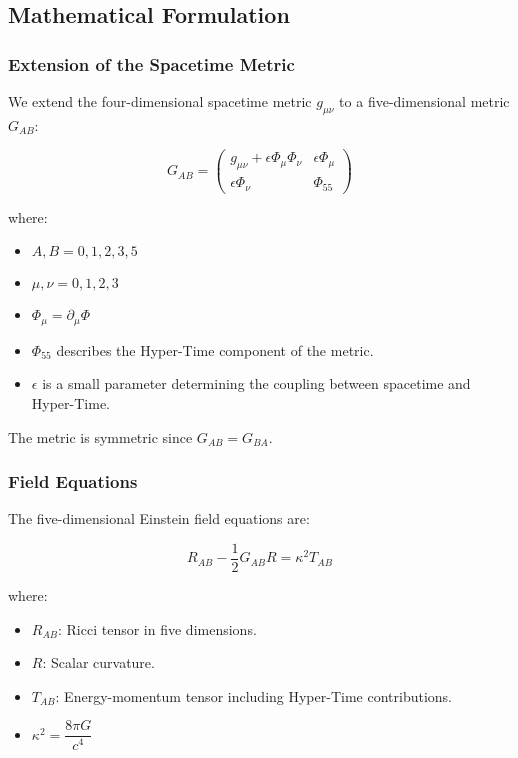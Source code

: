 \documentclass[11pt,a4paper]{article}
\begin{document}
\subsection{Mathematical Formulation}

\subsubsection{Extension of the Spacetime Metric}

We extend the four-dimensional spacetime metric $g_{\mu\nu}$ to a five-dimensional metric $G_{AB}$:

\begin{equation}
G_{AB} =
\begin{pmatrix}
g_{\mu\nu} + \epsilon \Phi_\mu \Phi_\nu & \epsilon \Phi_\mu \\
\epsilon \Phi_\nu & \Phi_{55}
\end{pmatrix}
\end{equation}

where:

\begin{itemize}
    \item $A, B = 0,1,2,3,5$
    \item $\mu, \nu = 0,1,2,3$
    \item $\Phi_\mu = \partial_\mu \Phi$
    \item $\Phi_{55}$ describes the Hyper-Time component of the metric.
    \item $\epsilon$ is a small parameter determining the coupling between spacetime and Hyper-Time.
\end{itemize}

The metric is symmetric since $G_{AB} = G_{BA}$.

\subsubsection{Field Equations}

The five-dimensional Einstein field equations are:

\begin{equation}
R_{AB} - \frac{1}{2} G_{AB} R = \kappa^2 T_{AB}
\end{equation}

where:

\begin{itemize}
    \item $R_{AB}$: Ricci tensor in five dimensions.
    \item $R$: Scalar curvature.
    \item $T_{AB}$: Energy-momentum tensor including Hyper-Time contributions.
    \item $\kappa^2 = \dfrac{8\pi G}{c^4}$
\end{itemize}
\end{document}
